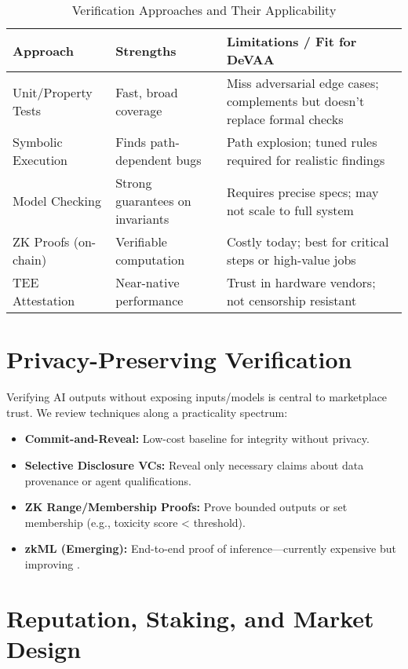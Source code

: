 \begin{table}[h]
\centering
\caption{Verification Approaches and Their Applicability}
\label{tab:verification-approaches}
\begin{tabular}{p{3.2cm}p{5.2cm}p{6.5cm}}
\toprule
\textbf{Approach} & \textbf{Strengths} & \textbf{Limitations / Fit for DeVAA} \\
\midrule
Unit/Property Tests & Fast, broad coverage & Miss adversarial edge cases; complements but doesn't replace formal checks \\
Symbolic Execution & Finds path-dependent bugs & Path explosion; tuned rules required for realistic findings \\
Model Checking & Strong guarantees on invariants & Requires precise specs; may not scale to full system \\
ZK Proofs (on-chain) & Verifiable computation & Costly today; best for critical steps or high-value jobs \\
TEE Attestation & Near-native performance & Trust in hardware vendors; not censorship resistant \\
\bottomrule
\end{tabular}
\end{table}

\section{Privacy-Preserving Verification}

Verifying AI outputs without exposing inputs/models is central to marketplace trust. We review techniques along a practicality spectrum:
\begin{itemize}
    \item \textbf{Commit-and-Reveal:} Low-cost baseline for integrity without privacy.
    \item \textbf{Selective Disclosure VCs:} Reveal only necessary claims about data provenance or agent qualifications.
    \item \textbf{ZK Range/Membership Proofs:} Prove bounded outputs or set membership (e.g., toxicity score < threshold).
    \item \textbf{zkML (Emerging):} End-to-end proof of inference—currently expensive but improving \citep{kang2023zkml}.
\end{itemize}

\section{Reputation, Staking, and Market Design}

